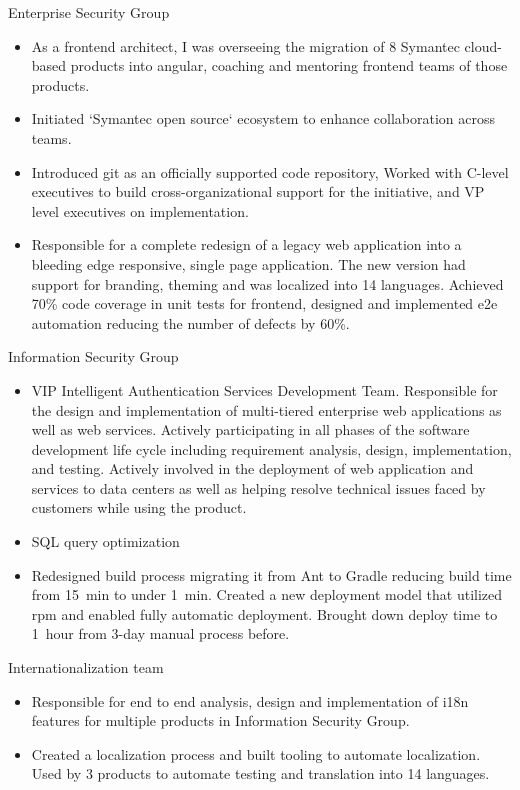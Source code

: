\documentclass[11pt,a4paper,roman]{moderncv}       %
\begin{document}
{Enterprise Security Group
\begin{itemize}
    \item As a frontend architect, I was overseeing the migration of 8 Symantec cloud-based products into angular, coaching and mentoring frontend teams of those products. 
    \item Initiated `Symantec open source` ecosystem to enhance collaboration across teams. 
    \item Introduced git as an officially supported code repository, Worked with C-level executives to build cross-organizational support for the initiative, and VP level executives on implementation.
    \item Responsible for a complete redesign of a legacy web application into a bleeding edge responsive, single page application. The new version had support for branding, theming and was localized into 14 languages. Achieved 70\% code coverage in unit tests for frontend, designed and implemented e2e automation reducing the number of defects by 60\%.
\end{itemize}

\medskip

Information Security Group

\begin{itemize}
    \item VIP Intelligent Authentication Services Development Team. Responsible for the design and implementation of multi-tiered enterprise web applications as well as web services. Actively participating in all phases of the software development life cycle including requirement analysis, design, implementation, and testing. Actively involved in the deployment of web application and services to data centers as well as helping resolve technical issues faced by customers while using the product.
    \item SQL query optimization
    \item Redesigned build process migrating it from Ant to Gradle reducing build time from 15~min to under 1~min. Created a new deployment model that utilized rpm and enabled fully automatic deployment. Brought down deploy time to 1~hour from 3-day manual process before.
\end{itemize}

\medskip

Internationalization team

\begin{itemize}
    \item Responsible for end to end analysis, design and implementation of i18n features for multiple products in Information Security Group.
    \item Created a localization process and built tooling to automate localization. Used by 3 products to automate testing and translation into 14 languages.
\end{itemize}

}
\end{document}
